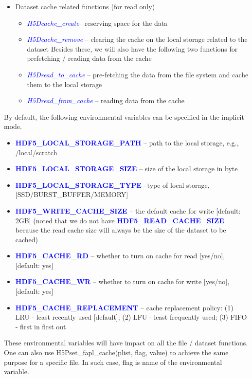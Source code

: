 \documentclass[aps, prb, 11pt, notitlepage]{revtex4-1}
\def\keywords#1{\textcolor{blue}{{\bf #1}}}
\def\function#1{\textcolor{blue}{{\it #1}}}
\begin{document}
\begin{itemize}
\begin{itemize}
\end{itemize}
\item Dataset cache related functions (for read only)
\begin{itemize}
\item \function{H5Dcache\_create}-- reserving space for the data
\item \function{H5Dcache\_remove} -- clearing the cache on the local storage related to the dataset Besides these, we will also have the following two functions for prefetching / reading data from the cache
\item \function{H5Dread\_to\_cache} -- pre-fetching the data from the file system and cache them to the local storage
\item \function{H5Dread\_from\_cache} -- reading data from the cache
\end{itemize}
\end{itemize}

By default, the following environmental variables can be specified in the implicit mode. 
\begin{itemize}
\item \keywords{HDF5\_LOCAL\_STORAGE\_PATH} -- path to the local storage, e.g., /local/scratch
\item \keywords{HDF5\_LOCAL\_STORAGE\_SIZE} -- size of the local storage in byte
\item \keywords{HDF5\_LOCAL\_STORAGE\_TYPE} --type of local storage, [SSD/BURST\_BUFFER/MEMORY]
\item \keywords{HDF5\_WRITE\_CACHE\_SIZE} -- the default cache for write [default: 2GB] (noted that we do not have \keywords{HDF5\_READ\_CACHE\_SIZE} because the read cache size will always be the size of the dataset to be cached)
\item \keywords{HDF5\_CACHE\_RD} -- whether to turn on cache for read [yes/no], [default: yes]
\item \keywords{HDF5\_CACHE\_WR} -- whether to turn on cache for write [yes/no], [default: yes]
\item \keywords{HDF5\_CACHE\_REPLACEMENT} -- cache replacement policy: (1) LRU - least recently used [default]; (2) LFU - least frequently used; (3) FIFO - first in first out
\end{itemize}
These environmental variables will have impact on all the file / dataset functions. One can also use H5Pset\_fapl\_cache(plist, flag, value) to achieve the same purpose for a specific file. In such case, flag is name of the environmental variable. 
\end{document}
